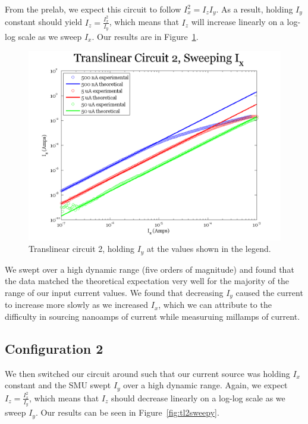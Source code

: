 \documentclass{article}
\begin{document}
From the prelab, we expect this circuit to follow $I_x ^2 = I_z I_y$.  As a result, holding $I_y$ constant should yield $I_z = \frac{I_x^2}{I_y}$, which means that $I_z$ will increase linearly on a log-log scale as we sweep $I_x$.  Our results are in Figure~\ref{fig:tl2sweepx}.

\begin{figure}[H]
\begin{center}
\includegraphics[scale=.75]{exp3_sweepx.png}
\caption{Translinear circuit 2, holding $I_y$ at the values shown in the legend.}
\label{fig:tl2sweepx}
\end{center}
\end{figure}

We swept over a high dynamic range (five orders of magnitude) and found that the data matched the theoretical expectation very well for the majority of the range of our input current values.  We found that decreasing $I_y$ caused the current to increase more slowly as we increased $I_x$, which we can attribute to the difficulty in sourcing nanoamps of current while measuruing millamps of current.

\subsection*{Configuration 2}

We then switched our circuit around such that our current source was holding $I_x$ constant and the SMU swept $I_y$ over a high dynamic range.  Again, we expect $I_z = \frac{I_x^2}{I_y}$, which means that $I_z$ should decrease linearly on a log-log scale as we sweep $I_y$.  Our results can be seen in Figure~\ref{fig:tl2sweepy}.
\end{document}
